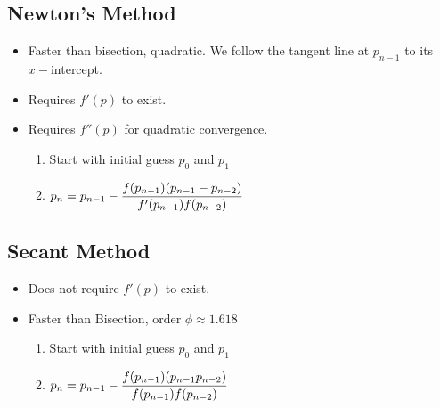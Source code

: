 \documentclass[8pt, letterpaper]{extarticle}
\begin{document}
\begin{multicols*}{3}
  \subsection{Newton's Method}
  \begin{itemize}
    \item Faster than bisection, quadratic. We follow the tangent line at $p_{n-1}$ to its
      $x-$intercept.
    \item Requires $f'(p)$ to exist.
    \item Requires $f''(p)$ for quadratic convergence.
      \begin{enumerate}
        \item Start with initial guess $p_0$ and $p_1$
        \item $\displaystyle p_n = p_{n-1} -
          \frac{f(p_{n-1})\pqty{p_{n-1}-p_{n-2}}}{f'(p_{n-1})f(p_{n-2})}$
      \end{enumerate}
  \end{itemize}

  \subsection{Secant Method}
  \begin{itemize}
    \item Does not require $f'(p)$ to exist.
    \item Faster than Bisection, order $\phi \approx 1.618$
      \begin{enumerate}
      \item Start with initial guess $p_0$ and $p_1$
      \item $\displaystyle p_n = p_{n-1} -
        \frac{f(p_{n-1})\pqty{p_{n-1}p_{n-2}}}{f(p_{n-1})f(p_{n-2})}$
      \end{enumerate}
  \end{itemize}



\end{multicols*}
\end{document}
